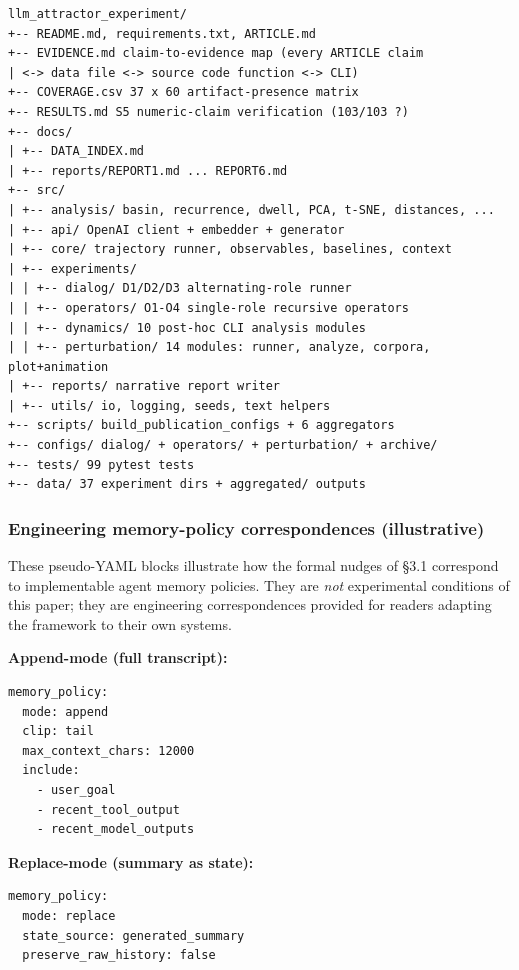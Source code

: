 \documentclass{article}
\newenvironment{codeblock}[1][]{%
  \par\addvspace{2pt}%
  \ifstrempty{#1}{}{\noindent\textit{\small #1}\par\nobreak\addvspace{2pt}}%
  \begingroup\footnotesize\begin{mdframed}[style=codestyle]%
}{%
  \end{mdframed}\endgroup\par%
}
\newenvironment{asciiblock}[1][]{%
  \par\addvspace{2pt}%
  \ifstrempty{#1}{}{\noindent\textit{\small #1}\par\nobreak\addvspace{2pt}}%
  \begingroup\footnotesize\begin{mdframed}[style=codestyle]%
}{%
  \end{mdframed}\endgroup\par%
}
\theoremstyle{plain}
\theoremstyle{definition}
\begin{document}
\begin{asciiblock}
\begin{verbatim}
llm_attractor_experiment/
+-- README.md, requirements.txt, ARTICLE.md
+-- EVIDENCE.md claim-to-evidence map (every ARTICLE claim
| <-> data file <-> source code function <-> CLI)
+-- COVERAGE.csv 37 x 60 artifact-presence matrix
+-- RESULTS.md S5 numeric-claim verification (103/103 ?)
+-- docs/
| +-- DATA_INDEX.md
| +-- reports/REPORT1.md ... REPORT6.md
+-- src/
| +-- analysis/ basin, recurrence, dwell, PCA, t-SNE, distances, ...
| +-- api/ OpenAI client + embedder + generator
| +-- core/ trajectory runner, observables, baselines, context
| +-- experiments/
| | +-- dialog/ D1/D2/D3 alternating-role runner
| | +-- operators/ O1-O4 single-role recursive operators
| | +-- dynamics/ 10 post-hoc CLI analysis modules
| | +-- perturbation/ 14 modules: runner, analyze, corpora, plot+animation
| +-- reports/ narrative report writer
| +-- utils/ io, logging, seeds, text helpers
+-- scripts/ build_publication_configs + 6 aggregators
+-- configs/ dialog/ + operators/ + perturbation/ + archive/
+-- tests/ 99 pytest tests
+-- data/ 37 experiment dirs + aggregated/ outputs
\end{verbatim}
\end{asciiblock}

\subsubsection*{Engineering memory-policy correspondences (illustrative)}

These pseudo-YAML blocks illustrate how the formal nudges of §3.1
correspond to implementable agent memory policies. They are \textit{not}
experimental conditions of this paper; they are engineering
correspondences provided for readers adapting the framework to their
own systems.

\textbf{Append-mode (full transcript):}

\begin{codeblock}
\begin{verbatim}
memory_policy:
  mode: append
  clip: tail
  max_context_chars: 12000
  include:
    - user_goal
    - recent_tool_output
    - recent_model_outputs
\end{verbatim}
\end{codeblock}

\textbf{Replace-mode (summary as state):}

\begin{codeblock}
\begin{verbatim}
memory_policy:
  mode: replace
  state_source: generated_summary
  preserve_raw_history: false
\end{verbatim}
\end{codeblock}
\end{document}
